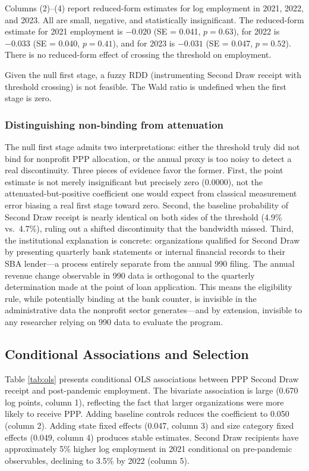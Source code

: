 \documentclass[12pt]{article}
\begin{document}
Columns (2)--(4) report reduced-form estimates for log employment in 2021, 2022, and 2023. All are small, negative, and statistically insignificant. The reduced-form estimate for 2021 employment is $-0.020$ (SE = 0.041, $p = 0.63$), for 2022 is $-0.033$ (SE = 0.040, $p = 0.41$), and for 2023 is $-0.031$ (SE = 0.047, $p = 0.52$). There is no reduced-form effect of crossing the threshold on employment.

Given the null first stage, a fuzzy RDD (instrumenting Second Draw receipt with threshold crossing) is not feasible. The Wald ratio is undefined when the first stage is zero.

\subsubsection*{Distinguishing non-binding from attenuation} The null first stage admits two interpretations: either the threshold truly did not bind for nonprofit PPP allocation, or the annual proxy is too noisy to detect a real discontinuity. Three pieces of evidence favor the former. First, the point estimate is not merely insignificant but precisely zero (0.0000), not the attenuated-but-positive coefficient one would expect from classical measurement error biasing a real first stage toward zero. Second, the baseline probability of Second Draw receipt is nearly identical on both sides of the threshold (4.9\% vs.\ 4.7\%), ruling out a shifted discontinuity that the bandwidth missed. Third, the institutional explanation is concrete: organizations qualified for Second Draw by presenting quarterly bank statements or internal financial records to their SBA lender---a process entirely separate from the annual 990 filing. The annual revenue change observable in 990 data is orthogonal to the quarterly determination made at the point of loan application. This means the eligibility rule, while potentially binding at the bank counter, is invisible in the administrative data the nonprofit sector generates---and by extension, invisible to any researcher relying on 990 data to evaluate the program.

\subsection{Conditional Associations and Selection}



Table \ref{tab:ols} presents conditional OLS associations between PPP Second Draw receipt and post-pandemic employment. The bivariate association is large (0.670 log points, column 1), reflecting the fact that larger organizations were more likely to receive PPP. Adding baseline controls reduces the coefficient to 0.050 (column 2). Adding state fixed effects (0.047, column 3) and size category fixed effects (0.049, column 4) produces stable estimates. Second Draw recipients have approximately 5\% higher log employment in 2021 conditional on pre-pandemic observables, declining to 3.5\% by 2022 (column 5).
\end{document}
